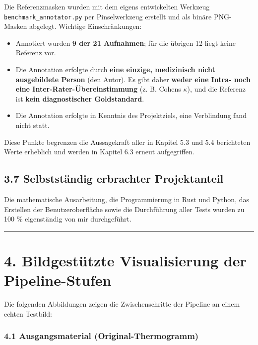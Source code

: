 \documentclass[
  11pt,
]{article}
\providecommand{\tightlist}{%
  \setlength{\itemsep}{0pt}\setlength{\parskip}{0pt}}
\begin{document}
Die Referenzmasken wurden mit dem eigens entwickelten Werkzeug
\texttt{benchmark\_annotator.py} per Pinselwerkzeug erstellt und als
binäre PNG-Masken abgelegt. Wichtige Einschränkungen:

\begin{itemize}
\tightlist
\item
  Annotiert wurden \textbf{9 der 21 Aufnahmen}; für die übrigen 12 liegt
  keine Referenz vor.
\item
  Die Annotation erfolgte durch \textbf{eine einzige, medizinisch nicht
  ausgebildete Person} (den Autor). Es gibt daher \textbf{weder eine
  Intra- noch eine Inter-Rater-Übereinstimmung} (z. B. Cohens
  \(\kappa\)), und die Referenz ist \textbf{kein diagnostischer
  Goldstandard}.
\item
  Die Annotation erfolgte in Kenntnis des Projektziels, eine Verblindung
  fand nicht statt.
\end{itemize}

Diese Punkte begrenzen die Aussagekraft aller in Kapitel 5.3 und 5.4
berichteten Werte erheblich und werden in Kapitel 6.3 erneut
aufgegriffen.

\subsection{3.7 Selbstständig erbrachter
Projektanteil}\label{selbststuxe4ndig-erbrachter-projektanteil}

Die mathematische Ausarbeitung, die Programmierung in Rust und Python,
das Erstellen der Benutzeroberfläche sowie die Durchführung aller Tests
wurden zu 100 \% eigenständig von mir durchgeführt.

\begin{center}\rule{0.5\linewidth}{0.5pt}\end{center}

\section{4. Bildgestützte Visualisierung der
Pipeline-Stufen}\label{bildgestuxfctzte-visualisierung-der-pipeline-stufen}

Die folgenden Abbildungen zeigen die Zwischenschritte der Pipeline an
einem echten Testbild:

\subsubsection{4.1 Ausgangsmaterial
(Original-Thermogramm)}\label{ausgangsmaterial-original-thermogramm}
\end{document}

